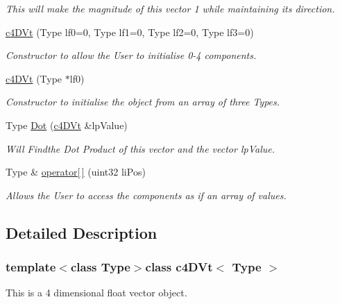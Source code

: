 \begin{DoxyCompactItemize}
\begin{DoxyCompactList}\small\item\em This will make the magnitude of this vector 1 while maintaining its direction. \end{DoxyCompactList}\item 
\hypertarget{classc4_d_vt_ae35e4cbd7a4b7973b785fd281286c18a}{
\hyperlink{classc4_d_vt_ae35e4cbd7a4b7973b785fd281286c18a}{c4DVt} (Type lf0=0, Type lf1=0, Type lf2=0, Type lf3=0)}
\label{classc4_d_vt_ae35e4cbd7a4b7973b785fd281286c18a}

\begin{DoxyCompactList}\small\item\em Constructor to allow the User to initialise 0-\/4 components. \end{DoxyCompactList}\item 
\hypertarget{classc4_d_vt_aa1e6d93beddae4c1a36645a078e03691}{
\hyperlink{classc4_d_vt_aa1e6d93beddae4c1a36645a078e03691}{c4DVt} (Type $\ast$lf0)}
\label{classc4_d_vt_aa1e6d93beddae4c1a36645a078e03691}

\begin{DoxyCompactList}\small\item\em Constructor to initialise the object from an array of three Types. \end{DoxyCompactList}\item 
\hypertarget{classc4_d_vt_a58d1e5c1e62985e9b5a4bfd967d09ca9}{
Type \hyperlink{classc4_d_vt_a58d1e5c1e62985e9b5a4bfd967d09ca9}{Dot} (\hyperlink{classc4_d_vt}{c4DVt} \&lpValue)}
\label{classc4_d_vt_a58d1e5c1e62985e9b5a4bfd967d09ca9}

\begin{DoxyCompactList}\small\item\em Will Findthe Dot Product of this vector and the vector lpValue. \end{DoxyCompactList}\item 
\hypertarget{classc4_d_vt_a6b6af602a5c86f9c726a5e9f6d6ebdb7}{
Type \& \hyperlink{classc4_d_vt_a6b6af602a5c86f9c726a5e9f6d6ebdb7}{operator\mbox{[}$\,$\mbox{]}} (uint32 liPos)}
\label{classc4_d_vt_a6b6af602a5c86f9c726a5e9f6d6ebdb7}

\begin{DoxyCompactList}\small\item\em Allows the User to access the components as if an array of values. \end{DoxyCompactList}\end{DoxyCompactItemize}


\subsection{Detailed Description}
\subsubsection*{template$<$class Type$>$class c4DVt$<$ Type $>$}

This is a 4 dimensional float vector object. 